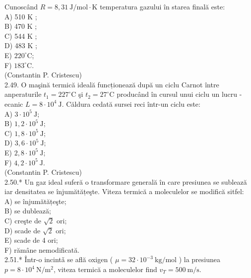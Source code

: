 Cunoscând $R=8,31 \mathrm{~J} / \mathrm{mol} \cdot \mathrm{K}$ temperatura gazului în starea finală este:\\
A) 510 K ;\\
B) 470 K ;\\
C) 544 K ;\\
D) 483 K ;\\
E) $220^{\circ} \mathrm{C}$;\\
F) $183^{\circ} \mathrm{C}$.\\
(Constantin P. Cristescu)\\
2.49. O maşină termică ideală funcționează după un ciclu Carnot între anperaturile $t_{1}=227^{\circ} \mathrm{C}$ şi $t_{2}=27^{\circ} \mathrm{C}$ producând în cursul unui ciclu un lucru -ecanic $L=8 \cdot 10^{4} \mathrm{~J}$. Căldura cedată sursei reci într-un ciclu este:\\
A) $3 \cdot 10^{5} \mathrm{~J}$;\\
B) $1,2 \cdot 10^{5} \mathrm{~J}$;\\
C) $1,8 \cdot 10^{5} \mathrm{~J}$;\\
D) $3,6 \cdot 10^{5} \mathrm{~J}$;\\
E) $2,8 \cdot 10^{5} \mathrm{~J}$;\\
F) $4,2 \cdot 10^{5} \mathrm{~J}$.\\
(Constantin P. Cristescu)\\
2.50.* Un gaz ideal suferă o transformare generală în care presiunea se sublează iar densitatea se înjumătățeşte. Viteza termică a moleculelor se modifică sitfel:\\
A) se înjumătățeşte;\\
B) se dublează;\\
C) creşte de $\sqrt{2}$ ori;\\
D) scade de $\sqrt{2}$ ori;\\
E) scade de 4 ori;\\
F) rămâne nemodificată.\\
2.51.* Într-o incintǎ se află oxigen ( $\mu=32 \cdot 10^{-3} \mathrm{~kg} / \mathrm{mol}$ ) la presiunea $p=8 \cdot 10^{4} \mathrm{~N} / \mathrm{m}^{2}$, viteza termică a moleculelor find $v_{T}=500 \mathrm{~m} / \mathrm{s}$.

